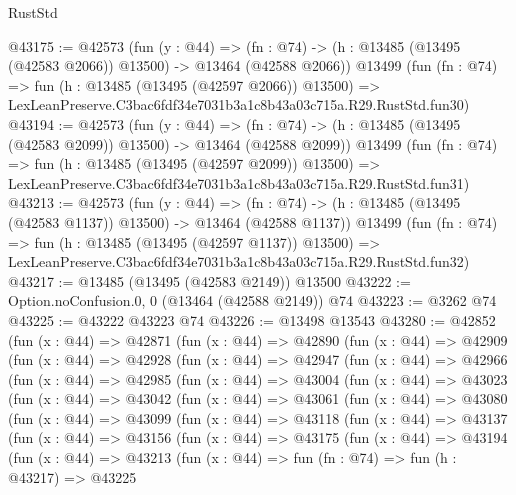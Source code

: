 \begin{lexlean}{RustStd}
\begin{coremodule}
@43175 := @42573
    (fun (y : @44) =>
    (fn : @74) -> (h : @13485 (@13495 (@42583 @2066)) @13500) -> @13464 (@42588 @2066))
    @13499
    (fun (fn : @74) =>
    fun (h : @13485 (@13495 (@42597 @2066)) @13500) =>
    LexLeanPreserve.C3bac6fdf34e7031b3a1c8b43a03c715a.R29.RustStd.fun30)
@43194 := @42573
    (fun (y : @44) =>
    (fn : @74) -> (h : @13485 (@13495 (@42583 @2099)) @13500) -> @13464 (@42588 @2099))
    @13499
    (fun (fn : @74) =>
    fun (h : @13485 (@13495 (@42597 @2099)) @13500) =>
    LexLeanPreserve.C3bac6fdf34e7031b3a1c8b43a03c715a.R29.RustStd.fun31)
@43213 := @42573
    (fun (y : @44) =>
    (fn : @74) -> (h : @13485 (@13495 (@42583 @1137)) @13500) -> @13464 (@42588 @1137))
    @13499
    (fun (fn : @74) =>
    fun (h : @13485 (@13495 (@42597 @1137)) @13500) =>
    LexLeanPreserve.C3bac6fdf34e7031b3a1c8b43a03c715a.R29.RustStd.fun32)
@43217 := @13485 (@13495 (@42583 @2149)) @13500
@43222 := Option.noConfusion.{0, 0} (@13464 (@42588 @2149)) @74
@43223 := @3262 @74
@43225 := @43222 @43223 @74
@43226 := @13498 @13543
@43280 := @42852
    (fun (x : @44) =>
    @42871
      (fun (x : @44) =>
      @42890
        (fun (x : @44) =>
        @42909
          (fun (x : @44) =>
          @42928
            (fun (x : @44) =>
            @42947
              (fun (x : @44) =>
              @42966
                (fun (x : @44) =>
                @42985
                  (fun (x : @44) =>
                  @43004
                    (fun (x : @44) =>
                    @43023
                      (fun (x : @44) =>
                      @43042
                        (fun (x : @44) =>
                        @43061
                          (fun (x : @44) =>
                          @43080
                            (fun (x : @44) =>
                            @43099
                              (fun (x : @44) =>
                              @43118
                                (fun (x : @44) =>
                                @43137
                                  (fun (x : @44) =>
                                  @43156
                                    (fun (x : @44) =>
                                    @43175
                                      (fun (x : @44) =>
                                      @43194
                                        (fun (x : @44) =>
                                        @43213
                                          (fun (x : @44) =>
                                          fun (fn : @74) =>
                                          fun (h : @43217) =>
                                          @43225

\end{coremodule}
\end{lexlean}
